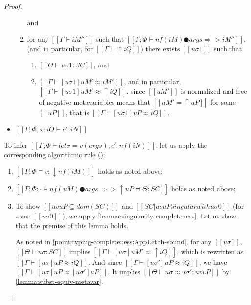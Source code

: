 \begin{proof}
\begin{caseof}
\begin{itemize}
\begin{enumerate}
\begin{enumerate}
                            \end{enumerate}
                            and
                        \item for any $[[Γ ⊢ iM'']]$
                            such that $[[Γ; Φ ⊢ nf(iM) ● args ⇒> iM'']]$,
                            (and in particular, for $[[Γ ⊢ ↑iQ]]$)
                            there exists $[[uσ1]]$ such that 
                            \begin{enumerate}
                                \item $[[Θ ⊢ uσ1 : SC]]$, and 
                                \item $[[Γ ⊢ [uσ1]uM' ≈ iM'']]$, and 
                                in particular, $[[Γ ⊢ [uσ1]uM' ≈ ↑iQ]]$.
                                since $[[uM']]$ is
                                normalized and free of 
                                negative metavariables means that 
                                $[[uM' = ↑uP]]$ for some $[[uP]]$, 
                                that is $[[Γ ⊢ [uσ1]uP ≈ iQ]]$.
                            \end{enumerate}
                    \end{enumerate}
                \item $[[Γ; Φ, x:iQ ⊢ c' : iN]]$
            \end{itemize}


            To infer $[[Γ ; Φ ⊢ let x = v(args); c' : nf(iN)]]$, 
            let us apply the corresponding algorithmic rule 
            ():
            \begin{enumerate}
                \item $[[Γ ; Φ ⊨ v : ↓nf(iM)]]$ holds as noted above;

                \item $[[Γ; Φ ; · ⊨ nf(uM) ● args ⇒> ↑uP ⫤ Θ; SC]]$ holds as noted above;

                \item To show $[[uv uP ⊆ dom(SC)]]$ and 
                    $[[SC | uv uP singular with uσ0]]$ (for some $[[uσ0]]$),
                    we apply \cref{lemma:singularity-completeness}.
                    Let us show that the premise of this lemma holds.

                    As noted in \ref{point:typing-completeness:AppLet:ih-sound},
                    for any $[[uσ]]$, $[[Θ ⊢ uσ : SC]]$ implies 
                    $[[Γ ⊢ [uσ]uM' ≈ ↑iQ]]$,
                    which is rewritten as $[[Γ ⊢ [uσ]uP ≈ iQ]]$.
                    And since $[[Γ ⊢ [uσ']uP ≈ iQ]]$, 
                    we have $[[Γ ⊢ [uσ]uP ≈ [uσ']uP]]$.
                    It implies $[[Θ ⊢ uσ ≈ uσ' : uv uP]]$
                    by \cref{lemma:subst-equiv-metavar}.


\end{enumerate}
\end{caseof}
\end{proof}
